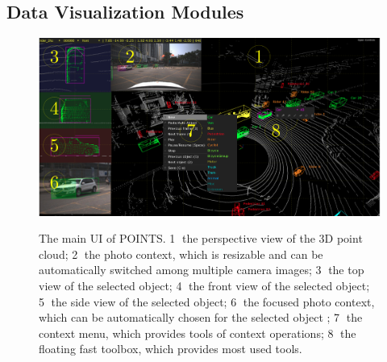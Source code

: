 \documentclass[letterpaper, 10 pt, conference]{ieeeconf}  %
\begin{document}
\subsection {Data Visualization Modules}
\label{sec:visualization}
\begin{figure}[!t]
	\centering	
	\includegraphics[width=\linewidth]{./figures/main-ui}\\
	\caption{The main UI of POINTS. 
		\textcircled{1} the perspective view of the 3D point cloud; 
		\textcircled{2} the photo context, which is resizable and can be automatically switched among multiple camera images; 
		\textcircled{3} the top view of the selected object;
		\textcircled{4} the front view of the selected object; 
		\textcircled{5} the side view of the selected object; 
		\textcircled{6} the focused photo context, which can be automatically chosen for the selected object ;
		\textcircled{7} the context menu, which provides tools of context operations; 
		\textcircled{8} the floating fast toolbox, which provides most used tools.}
	\label{fig:main-ui}
\end{figure}
\end{document}
